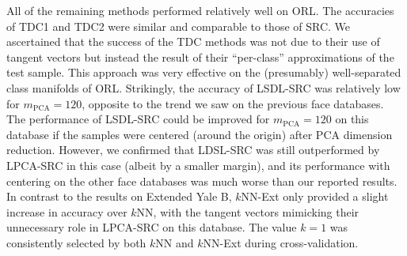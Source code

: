 \documentclass[review]{elsarticle}
\begin{document}
All of the remaining methods performed relatively well on ORL. The accuracies of TDC1 and TDC2 were similar and comparable to those of SRC. We ascertained that the success of the TDC methods was not due to their use of tangent vectors but instead the result of their ``per-class'' approximations of the test sample. This approach was very effective on the (presumably) well-separated class manifolds of ORL. Strikingly, the accuracy of LSDL-SRC was relatively low for $m_\mathrm{PCA} = 120$, opposite to the trend we saw on the previous face databases. The performance of LSDL-SRC could be improved for $m_\mathrm{PCA}=120$ on this database if the samples were centered (around the origin) after PCA dimension reduction. However, we confirmed that LDSL-SRC was still outperformed by LPCA-SRC in this case (albeit by a smaller margin), and its performance with centering on the other face databases was much worse than our reported results. In contrast to the results on Extended Yale B, $k$NN-Ext only provided a slight increase in accuracy over $k$NN, with the tangent vectors mimicking their unnecessary role in LPCA-SRC on this database. The value $k=1$ was consistently selected by both $k$NN and $k$NN-Ext during cross-validation. 
\end{document}
